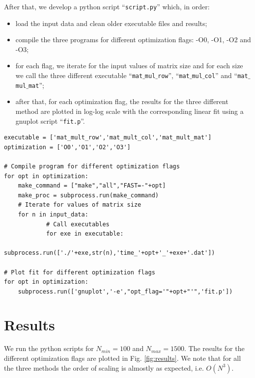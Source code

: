 \documentclass[rmp,10pt,onecolumn,fleqn,notitlepage]{revtex4-1}
\begin{document}
After that, we develop a python script “\texttt{script.py}” which, in order:
\begin{itemize}
\item load the input data and clean older executable files and results;
\item compile the three programs for different optimization flags: -O0, -O1, -O2 and -O3;
\item for each flag, we iterate for the input values of matrix size and for each size we call the three different executable “\texttt{mat$\_$mul$\_$row}”, “\texttt{mat$\_$mul$\_$col}” and “\texttt{mat$\_$mul$\_$mat}”;
\item after that, for each optimization flag, the results for the three different method are plotted in log-log scale with the corresponding linear fit using a gnuplot script “\texttt{fit.p}”.
\end{itemize}

\begin{minipage}[t]{0.73\linewidth}%
\begin{lstlisting}[style=Python]
executable = ['mat_mult_row','mat_mult_col','mat_mult_mat']
optimization = ['O0','O1','O2','O3']

# Compile program for different optimization flags
for opt in optimization:
    make_command = ["make","all","FAST=-"+opt]
    make_proc = subprocess.run(make_command)
    # Iterate for values of matrix size
    for n in input_data:
            # Call executables
            for exe in executable:
                subprocess.run(['./'+exe,str(n),'time_'+opt+'_'+exe+'.dat'])

# Plot fit for different optimization flags
for opt in optimization:
    subprocess.run(['gnuplot','-e',"opt_flag='"+opt+"'",'fit.p'])\end{lstlisting}
\end{minipage}



\section{Results}
We run the python scripts for \( N_{min}=100 \) and \( N_{max}=1500 \). The results for the different optimization flags are plotted in Fig. \ref{fig:results}. We note that for all the three methods the order of scaling is almostly as expected, i.e. \( O(N^3) \).
\end{document}
